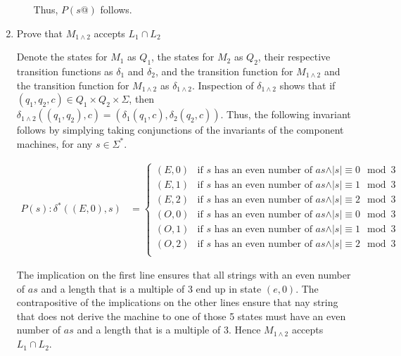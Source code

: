 \documentclass[12pt]{article}
\begin{document}
\begin{enumerate}[1.]
\begin{enumerate}[1.]
\begin{mdframed}
            \bigskip

            Thus, $P(s@)$ follows.
        \end{mdframed}

    \end{enumerate}

    \item Prove that $M_{1\land2}$ accepts $L_1 \cap L_2$

    \bigskip

    Denote the states for $M_1$ as $Q_1$, the states for $M_2$ as $Q_2$, their
    respective transition functions as $\delta_1$ and $\delta_2$, and the transition
    function for $M_{1\land 2}$ and the transition function for $M_{1\land 2}$ as $\delta_{1 \land 2}$.
    Inspection of $\delta_{1 \land 2}$ shows that if $(q_1,q_2,c) \in Q_1 \times Q_2 \times \Sigma$,
    then $\delta_{1\land 2}((q_1,q_2),c) = (\delta_1(q_1,c),\delta_2(q_2,c))$. Thus,
    the following invariant follows by simplying taking conjunctions of the invariants
    of the component machines, for any $s \in \Sigma^*$.

    \begin{align}
        P(s):\delta^*((E,0),s) &= \begin{cases}
            (E,0) & \text{if $s$ has an even number of $as \land \vert s \vert \equiv 0 \mod 3$}\\
            (E,1) & \text{if $s$ has an even number of $as \land \vert s \vert \equiv 1 \mod 3$}\\
            (E,2) & \text{if $s$ has an even number of $as \land \vert s \vert \equiv 2 \mod 3$}\\
            (O,0) & \text{if $s$ has an even number of $as \land \vert s \vert \equiv 0 \mod 3$}\\
            (O,1) & \text{if $s$ has an even number of $as \land \vert s \vert \equiv 1 \mod 3$}\\
            (O,2) & \text{if $s$ has an even number of $as \land \vert s \vert \equiv 2 \mod 3$}\\
        \end{cases}
    \end{align}

    \bigskip

    The implication on the first line ensures that all strings with an even number
    of $as$ and a length that is a multiple of 3 end up in state $(e,0)$. The
    contrapositive of the implications on the other lines ensure that nay string that does
    not derive the machine to one of those 5 states must have an even number of $as$
    and a length that is a multiple of 3. Hence $M_{1 \land 2}$ accepts
    $L_1 \cap L_2$.
    \end{enumerate}
\end{document}
